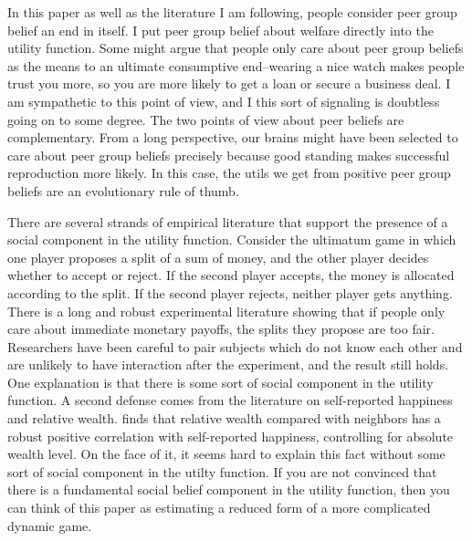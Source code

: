 In this paper as well as the literature I am following, people consider peer group belief an end in itself.  I put peer group belief about welfare directly into the utility function.  Some might argue that people only care about peer group beliefs as the means to an ultimate consumptive end--wearing a nice watch makes people trust you more, so you are more likely to get a loan or secure a business deal.  I am sympathetic to this point of view, and I this sort of signaling is doubtless going on to some degree.  The two points of view about peer beliefs are complementary.  From a long perspective, our brains might have been selected to care about peer group beliefs precisely because good standing makes successful reproduction more likely. In this case, the utils we get from positive peer group beliefs are an evolutionary rule of thumb.\citep{RobsonSamuelson2010}

There are several strands of empirical literature that support the presence of a social component in the utility function.  Consider the ultimatum game in which one player proposes a split of a sum of money, and the other player decides whether to accept or reject.  If the second player accepts, the money is allocated according to the split. If the second player rejects, neither player gets anything.  There is a long and robust experimental literature showing that if people only care about immediate monetary payoffs, the splits they propose are too fair.  Researchers have been careful to pair subjects which do not know each other and are unlikely to have interaction after the experiment, and the result still holds.  One explanation is that there is some sort of social component in the utility function. \citep{FehrSchmidt1999,BoltonOckenfels2000}  A second defense comes from the literature on self-reported happiness and relative wealth.  \citet{Luttmer2004} finds that relative wealth compared with neighbors has a robust positive correlation  with self-reported happiness, controlling for absolute wealth level.  On the face of it, it seems hard to explain this fact without some sort of social component in the utilty function.  If you are not convinced that there is a fundamental social belief component in the utility function, then you can think of this paper as estimating a reduced form of a more complicated dynamic game.

